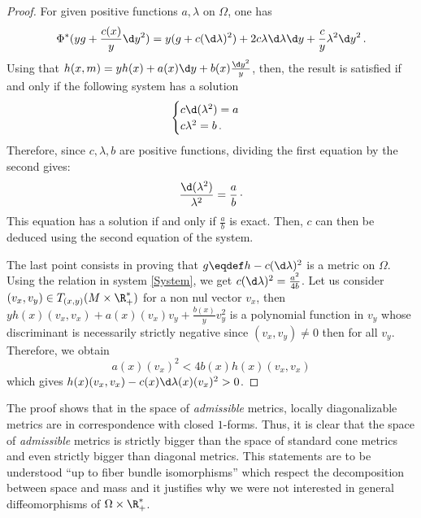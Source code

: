 \begin{proof}
For given positive functions $a, \lambda$ on $\Omega$, one has
\begin{equation}
\Phi^*(yg +  \frac{c(x)}{ y} \d y^2) = y (g + c (\d \lambda)^2) + 2c \lambda \d \lambda  \d y + \frac{c}{y} \lambda^2 \d y^2\,.
\end{equation}
Using that
$h(x,m) = y h(x) + a(x) \d y + b(x) \frac{\d y^2}{y}$,
then, the result is satisfied if and only if the following system  has a solution
\begin{equation}\label{System}
\begin{cases}
c  \d (\lambda^2)= a \\
c \lambda^2 =  b \,.
\end{cases}
\end{equation} 
Therefore, since $c, \lambda,b$ are positive functions, dividing the first equation by the second gives:
$$ \frac{\d (\lambda^2)}{\lambda^2} = \frac{a}{b}\,\cdot$$ 
This equation has a solution if and only if  $\frac{a}{b}$ is exact. Then, $c$ can then be deduced using the second equation of the system.

The last point consists in proving that $g \eqdef h - c (\d \lambda)^2 $ is a metric on $\Omega$. Using the relation in system \eqref{System}, we get 
$c  (\d \lambda)^2 = \frac{a^2}{4b}$. Let us consider $(v_x,v_y) \in T_{(x,y)}(M \times \R_+^*)$ for a non nul vector $v_x$, then $yh(x)(v_x,v_x) + a(x)(v_x)v_y + \frac{b(x)}{y}v_y^2$ is a polynomial function in $v_y$ whose discriminant is necessarily strictly negative since $(v_x,v_y) \neq 0$ then for all $v_y$. Therefore, we obtain 
\begin{equation}
a(x)(v_x)^2 < 4 b(x)h(x)(v_x,v_x)
\end{equation}
which gives $h(x)(v_x,v_x) - c(x) \d \lambda(x)(v_x)^2 > 0$.
\end{proof}

\begin{remark}
The proof shows that in the space of \textit{admissible} metrics, locally diagonalizable metrics are in correspondence with closed $1$-forms. Thus, it is clear that the space of \textit{admissible} metrics is strictly bigger than the space of standard cone metrics and even strictly bigger than diagonal metrics. This statements are to be understood ``up to fiber bundle isomorphisms'' which respect the decomposition between space and mass and it justifies why we were not interested in general diffeomorphisms of $\Omega \times \R^*_+$.
\end{remark}


